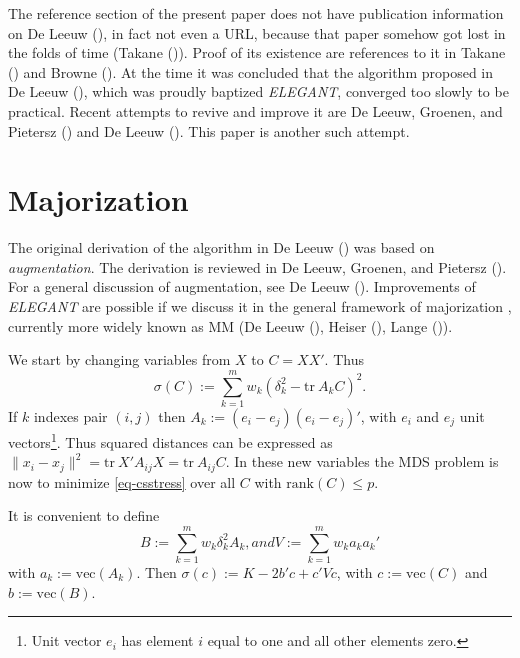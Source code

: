\documentclass[
  12pt,
  letterpaper,
  DIV=11,
  numbers=noendperiod]{scrartcl}
\newcommand{\sectionbreak}{\clearpage}
\begin{document}
The reference section of the present paper does not have publication
information on De Leeuw (), in fact
not even a URL, because that paper somehow got lost in the folds of time
(Takane ()). Proof of its existence are
references to it in Takane () and Browne
(). At the time it was concluded that the
algorithm proposed in De Leeuw (),
which was proudly baptized \emph{ELEGANT}, converged too slowly to be
practical. Recent attempts to revive and improve it are De Leeuw,
Groenen, and Pietersz
() and De Leeuw
(). This paper is another such
attempt.

\sectionbreak

\section{Majorization}\label{majorization}

The original derivation of the algorithm in De Leeuw
() was based on \emph{augmentation}.
The derivation is reviewed in De Leeuw, Groenen, and Pietersz
(). For a general
discussion of augmentation, see De Leeuw
(). Improvements of \emph{ELEGANT} are
possible if we discuss it in the general framework of majorization ,
currently more widely known as MM (De Leeuw
(), Heiser
(), Lange
()).

We start by changing variables from \(X\) to \(C=XX'\). Thus
\begin{equation}
\sigma(C):=\sum_{k=1}^m w_k(\delta_k^2-\text{tr}\ A_kC)^2.\label{eq-csstress}
\end{equation} If \(k\) indexes pair \((i,j)\) then
\(A_k:=(e_i-e_j)(e_i-e_j)'\), with \(e_i\) and \(e_j\) unit
vectors\footnote{Unit vector $e_i$
has element $i$ equal to one and all other elements zero.}. Thus squared
distances can be expressed as
\(\|x_i-x_j\|^2=\text{tr}\ X'A_{ij}X=\text{tr}\ A_{ij}C\). In these new
variables the MDS problem is now to minimize \eqref{eq-csstress} over
all \(C\) with \(\text{rank}(C)\leq p\).

It is convenient to define \begin{subequations}
\begin{equation}
B:=\sum_{k=1}^m w_k\delta_k^2A_k,
\end{equation}
and 
\begin{equation}
V:=\sum_{k=1}^m w_ka_ka_k'
\end{equation}
\end{subequations} with \(a_k:=\text{vec}(A_k)\). Then
\(\sigma(c):=K-2b'c+c'Vc\), with \(c:=\text{vec}(C)\) and
\(b:=\text{vec}(B)\).
\end{document}
